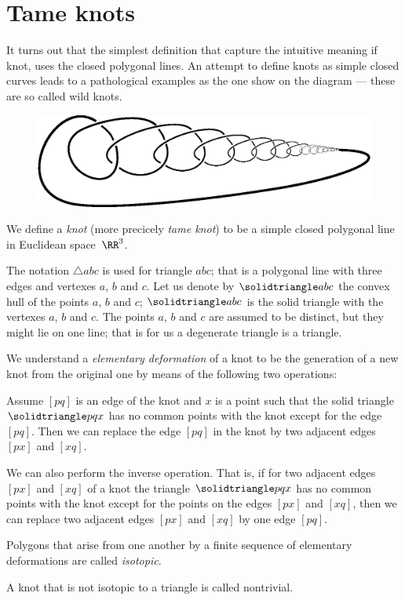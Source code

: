 \section{Tame knots}

It turns out that the simplest definition that capture the intuitive meaning if knot,
uses the closed polygonal lines.
An attempt to define knots as simple closed curves leads to a pathological examples as the one show on the diagram --- these are so called wild knots.

\begin{figure}[h]
\vskip-0mm
\centering
\includegraphics[scale=.6]{pics/Wild_knot}
\vskip0mm
\end{figure}

We define a \emph{knot} (more precicely \emph{tame knot}) to be a simple closed polygonal line in Euclidean space~$\RR^3$.

The notation $\triangle abc$ is used for triangle $abc$; that is a polygonal line with three edges and vertexes $a$, $b$ and $c$.
Let us denote by $\solidtriangle abc$ the convex hull of the points $a$, $b$ and $c$; $\solidtriangle abc$ is the solid triangle with the vertexes $a$, $b$ and $c$.
The points $a$, $b$ and $c$ are assumed to be distinct, but they might lie on one line;
that is for us a degenerate triangle is a triangle.

We understand a \emph{elementary deformation} of a knot to be the generation of a new knot from the original one by means of the
following two operations:

Assume $[pq]$ is an edge of the knot and $x$
is a point such that the solid triangle $\solidtriangle pqx$  has no common points with the knot except for the edge $[pq]$.
Then we can replace the edge $[pq]$ in the knot by two adjacent edges $[px]$ and $[xq]$.

We can also perform the inverse operation.
That is, if for two adjacent edges $[px]$ and $[xq]$ of a knot the triangle
$\solidtriangle pqx$ has no common points with the knot except for the points on the edges $[px]$ and $[xq]$,
then we can replace two adjacent edges $[px]$ and $[xq]$ by one edge $[pq]$.

Polygons that arise from one another by a finite sequence of
elementary deformations are called \emph{isotopic}.

A knot that is not isotopic to a triangle is called nontrivial.




